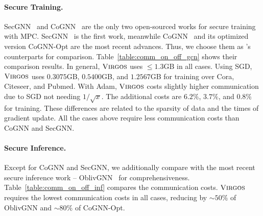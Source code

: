 \paragraph{Secure Training.} 
SecGNN~\cite{tsc/WangZJ23} and  CoGNN~\cite{ccs/ZouLSLXX24} are the only two open-sourced works for secure training with MPC.
SecGNN~\cite{tsc/WangZJ23} is the first work, meanwhile
 CoGNN~\cite{ccs/ZouLSLXX24} and its optimized version CoGNN-Opt are the most recent advances.
Thus, we choose them as \cgnn's counterparts for comparison.
Table~\ref{table:comm_on_off_gcn} shows their comparison results.
In general, $\textnormal{\textsc{Virgos}}$ uses ${\leq}1.3$GB in all cases.
Using SGD, $\textnormal{\textsc{Virgos}}$ uses $0.3075$GB, $0.5400$GB, and $1.2567$GB for training over Cora, Citeseer, and Pubmed.
With Adam, $\textnormal{\textsc{Virgos}}$ costs slightly higher communication due to SGD not needing $1/\sqrt{x}.$
The additional
costs are $6.2\%$, $3.7\%$, and $0.8\%$ for
training.
These differences are related to the sparsity of
data and the times of gradient update.
All the cases above require less communication costs than CoGNN and SecGNN.




\paragraph{Secure Inference.}
Except for CoGNN and SecGNN, we additionally compare \cgnn with the most recent secure inference  work -- OblivGNN~\cite{uss/XuL0AYY24} for comprehensiveness.
Table~\ref{table:comm_on_off_inf} compares the communication costs.
$\textnormal{\textsc{Virgos}}$ requires the lowest communication costs in all cases, reducing by  $\sim50\%$ of OblivGNN and $\sim 80\%$ of CoGNN-Opt.


\iffalse
\begin{figure}[!t]
 	\centering
 	\texttt{[image: ./fig\_and\_tab/fig\_comm\_inf]}
 	\caption{ Communication for Inference}
 	\label{fig_comm_on_off_inf}
\end{figure}
\fi

